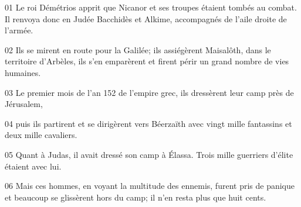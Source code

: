 01 Le roi Démétrios apprit que Nicanor et ses troupes étaient tombés au combat. Il renvoya donc en Judée Bacchidès et Alkime, accompagnés de l’aile droite de l’armée.

02 Ils se mirent en route pour la Galilée; ils assiégèrent Maisalôth, dans le territoire d’Arbèles, ils s’en emparèrent et firent périr un grand nombre de vies humaines.

03 Le premier mois de l’an 152 de l’empire grec, ils dressèrent leur camp près de Jérusalem,

04 puis ils partirent et se dirigèrent vers Béerzaïth avec vingt mille fantassins et deux mille cavaliers.

05 Quant à Judas, il avait dressé son camp à Élassa. Trois mille guerriers d’élite étaient avec lui.

06 Mais ces hommes, en voyant la multitude des ennemis, furent pris de panique et beaucoup se glissèrent hors du camp; il n’en resta plus que huit cents.
